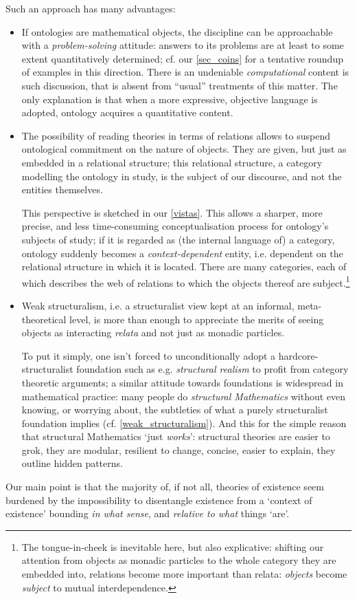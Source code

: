 Such an approach has many advantages:
\begin{itemize}
	\item If ontologies are mathematical objects, the discipline can be approachable with a \emph{problem-solving} attitude: answers to its problems are at least to some extent quantitatively determined; cf. our \autoref{sec_coins} for a tentative roundup of examples in this direction. There is an undeniable \emph{computational} content is such discussion, that is absent from ``usual'' treatments of this matter. The only explanation is that when a more expressive, objective language is adopted, ontology acquires a quantitative content.
	\item The possibility of reading theories in terms of relations allows to suspend ontological commitment on the nature of objects. They are given, but just as embedded in a relational structure; this relational structure, a category modelling the ontology in study, is the subject of our discourse, and not the entities themselves.

	      This perspective is sketched in our \autoref{vistas}. This allows a sharper, more precise, and less time-consuming conceptualisation process for ontology's subjects of study; if it is regarded as (the internal language of) a category, ontology suddenly becomes a \emph{context-dependent} entity, i.e. dependent on the relational structure in which it is located. There are many categories, each of which describes the web of relations to which the objects thereof are subject.\footnote{The tongue-in-cheek is inevitable here, but also explicative: shifting our attention from objects as monadic particles to the whole category they are embedded into, relations become more important than relata: \emph{objects} become \emph{subject} to mutual interdependence.}
	\item Weak structuralism, i.e. a structuralist view kept at an informal, meta\hyp{}theoretical level, is more than enough to appreciate the merits of seeing objects as interacting \emph{relata} and not just as monadic particles.

	      To put it simply, one isn't forced to unconditionally adopt a hardcore\hyp{}structuralist foundation such as e.g. \emph{structural realism} \cite{bain2013category,eva2016category} to profit from category theoretic arguments; a similar attitude towards foundations is widespread in mathematical practice: many people do \textit{structural Mathematics} without even knowing, or worrying about, the subtleties of what a purely structuralist foundation implies (cf. \autoref{weak_structuralism}). And this for the simple reason that structural Mathematics `just \emph{works}': structural theories are easier to grok, they are modular, resilient to change, concise, easier to explain, they outline hidden patterns.
\end{itemize}
Our main point is that the majority of, if not all, theories of existence seem burdened by the impossibility to disentangle existence from a `context of existence' bounding \emph{in what sense}, and \emph{relative to what} things `are'.

